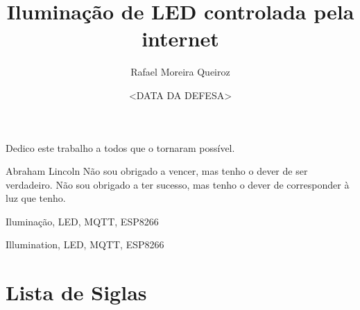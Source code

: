 \documentclass[bsc]{ufpethesis}
\institute{Centro de Tecnologia e Geociências}
\title{Iluminação de LED controlada pela internet}
\date{<DATA DA DEFESA>}
\author{Rafael Moreira Queiroz}
\begin{document}
\frontmatter

\frontpage

\presentationpage

\begin{dedicatory}
    Dedico este trabalho a todos que o tornaram possível.
\end{dedicatory}

\acknowledgements
    

\begin{epigraph}{Abraham Lincoln}
Não sou obrigado a vencer, mas tenho o dever de ser verdadeiro. Não sou obrigado a ter sucesso, mas tenho o dever de corresponder à luz que tenho.
\end{epigraph}

\resumo

\begin{keywords}
    Iluminação, LED, MQTT, ESP8266
\end{keywords}

\abstract

\begin{keywords}
    Illumination, LED, MQTT, ESP8266
\end{keywords}

\tableofcontents

\listoffigures

\listoftables

\chapter*{Lista de Siglas}
\begin{acronym}[MQTT]
\end{acronym}
\end{document}
